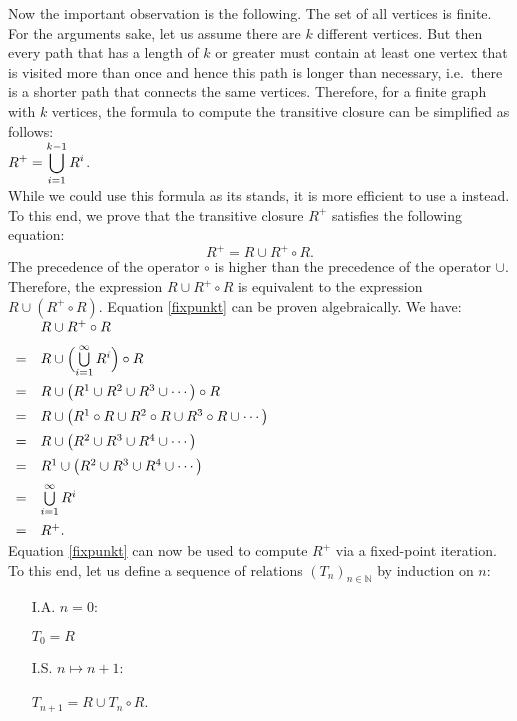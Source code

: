 Now the important observation is the following. The set of all vertices is finite.  For the arguments sake, let
us assume there are $k$ different vertices.  But then every path that has a length of $k$ or greater must
contain at least one vertex that is visited more than once and hence this path is longer than necessary,
i.e.~there is a shorter path that connects the same vertices.  Therefore, for a finite graph with $k$ vertices,
the formula to compute the transitive closure can be simplified as follows:
\\[0.2cm]
\hspace*{1.3cm} 
$\displaystyle R^+ = \bigcup\limits_{i=1}^{k-1} R^i$.
\\[0.2cm]
While we could use this formula as its stands, it is more efficient to use a  instead.
To this end, we prove that the transitive closure $R^+$ satisfies the following equation:
\begin{equation}
  \label{fixpunkt}
  R^+ = R \cup R^+ \circ R. 
\end{equation}
The precedence of the operator $\circ$ 
is higher than the precedence of the operator $\cup$.  Therefore, the expression $R \cup R^+ \circ R$ is
equivalent to the expression $R \cup (R^+ \circ R)$.  Equation \ref{fixpunkt} can be proven algebraically.  We have:
\\[0.2cm]
\hspace*{1.3cm}
$
\begin{array}{cll}
    & R \cup R^+ \circ R \\[0.2cm]
  = & R \cup \Bigl(\bigcup\limits_{i=1}^{\infty} R^i \Bigr) \circ R \\[0.4cm]
  = & R \cup \bigl(R^1 \cup R^2 \cup R^3 \cup \cdots \bigr) \circ R \\[0.2cm]
  = & R \cup \bigl(R^1 \circ R \cup R^2 \circ R \cup R^3 \circ R \cup \cdots \bigr) \\[0.2cm]
  = & R \cup \bigl(R^2 \cup R^3 \cup  R^4 \cup \cdots \bigr)  \\[0.2cm]
  = & R^1 \cup \bigl(R^2 \cup R^3 \cup  R^4 \cup \cdots \bigr) \\[0.2cm]
  = & \bigcup\limits_{i=1}^{\infty} R^i \\[0.4cm]
  = & R^+.
\end{array}
$
\\[0.2cm]
Equation  \ref{fixpunkt} can now be used to compute $R^+$ via a fixed-point iteration.
To this end, let us define a sequence of relations $(T_n)_{n \in \mathbb{N}}$ by induction on $n$:
\begin{enumerate}
\item[I.A.] $n = 0$: 

            $T_0 = R$
\item[I.S.] $n \mapsto n+1$:

            $T_{n+1} = R \cup T_n \circ R $. 
\end{enumerate}
